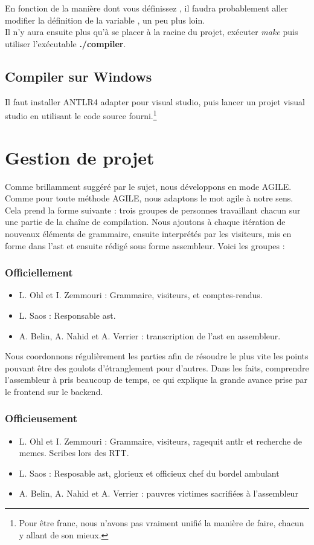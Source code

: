 \documentclass{report}
\begin{document}
En fonction de la manière dont vous définissez , il faudra probablement aller modifier la définition de la variable , un peu plus loin.\\
Il n'y aura ensuite plus qu'à se placer à la racine du projet, exécuter \emph{make} puis utiliser l'exécutable \textbf{./compiler}.

\subsection{Compiler sur Windows}
\label{subsec:Windows}

Il faut installer ANTLR4 adapter pour visual studio, puis lancer un projet visual studio en utilisant le code source fourni.\footnote{Pour être franc, nous n'avons pas vraiment unifié la manière de faire, chacun y allant de son mieux.}

\section{Gestion de projet}
\label{sec:Management}

Comme brillamment suggéré par le sujet, nous développons en mode AGILE. Comme pour toute méthode AGILE, nous adaptons le mot agile à notre sens. Cela prend la forme suivante : trois groupes de personnes travaillant chacun sur une partie de la chaîne de compilation.  Nous ajoutons à chaque itération de nouveaux éléments de grammaire, ensuite interprétés par les visiteurs, mis en forme dans l'ast et ensuite rédigé sous forme assembleur.
Voici les groupes :
\subsubsection{Officiellement}
\begin{itemize}
\item L. Ohl et I. Zemmouri : Grammaire, visiteurs, et comptes-rendus.
\item L. Saos : Responsable ast.
\item A. Belin, A. Nahid et A. Verrier : transcription de l'ast en assembleur.
\end{itemize}

Nous coordonnons régulièrement les parties afin de résoudre le plus vite les points pouvant être des goulots d'étranglement pour d'autres. Dans les faits, comprendre l'assembleur à pris beaucoup de temps, ce qui explique la grande avance prise par le frontend sur le backend.

\subsubsection{Officieusement}
\begin{itemize}
\item L. Ohl et I. Zemmouri : Grammaire, visiteurs, ragequit antlr et recherche de memes. Scribes lors des RTT.
\item L. Saos : Resposable ast, glorieux et officieux chef du bordel ambulant
\item A. Belin, A. Nahid et A. Verrier : pauvres victimes sacrifiées à l'assembleur
\end{itemize}
\end{document}
